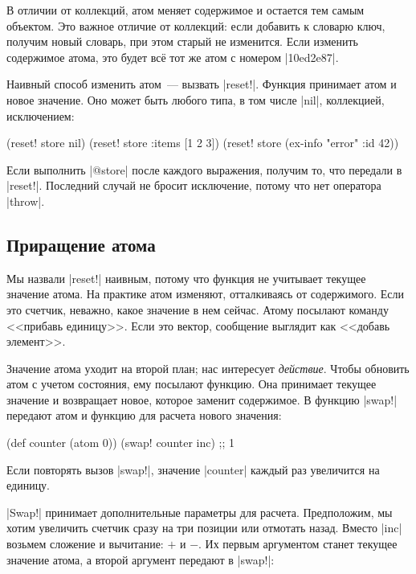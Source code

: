 В отличии от коллекций, атом меняет содержимое и остается тем самым
объектом. Это важное отличие от коллекций: если добавить к словарю ключ, получим
новый словарь, при этом старый не изменится. Если изменить содержимое атома, это
будет вс\"{е} тот же атом с номером \spverb|10ed2e87|.

Наивный способ изменить атом~--- вызвать \spverb|reset!|. Функция принимает атом
и новое значение. Оно может быть любого типа, в том числе \spverb|nil|,
коллекцией, исключением:

\begin{english}
  \begin{clojure}
(reset! store nil)
(reset! store {:items [1 2 3]})
(reset! store (ex-info "error" {:id 42}))
  \end{clojure}
\end{english}

Если выполнить \spverb|@store| после каждого выражения, получим то, что передали
в \spverb|reset!|. Последний случай не бросит исключение, потому что нет
оператора \spverb|throw|.

\subsection{Приращение атома}

Мы назвали \spverb|reset!| наивным, потому что функция не учитывает текущее
значение атома. На практике атом изменяют, отталкиваясь от содержимого. Если это
счетчик, неважно, какое значение в нем сейчас. Атому посылают команду <<прибавь
единицу>>. Если это вектор, сообщение выглядит как <<добавь элемент>>.

Значение атома уходит на второй план; нас интересует \emph{действие}. Чтобы
обновить атом с учетом состояния, ему посылают функцию. Она принимает текущее
значение и возвращает новое, которое заменит содержимое. В функцию
\spverb|swap!| передают атом и функцию для расчета нового значения:

\begin{english}
  \begin{clojure}
(def counter (atom 0))
(swap! counter inc) ;; 1
  \end{clojure}
\end{english}

Если повторять вызов \spverb|swap!|, значение \spverb|counter| каждый раз
увеличится на единицу.

\spverb|Swap!| принимает дополнительные параметры для расчета. Предположим, мы
хотим увеличить счетчик сразу на три позиции или отмотать назад. Вместо
\spverb|inc| возьмем сложение и вычитание: $+$ и $-$. Их первым аргументом
станет текущее значение атома, а второй аргумент передают в \spverb|swap!|:

